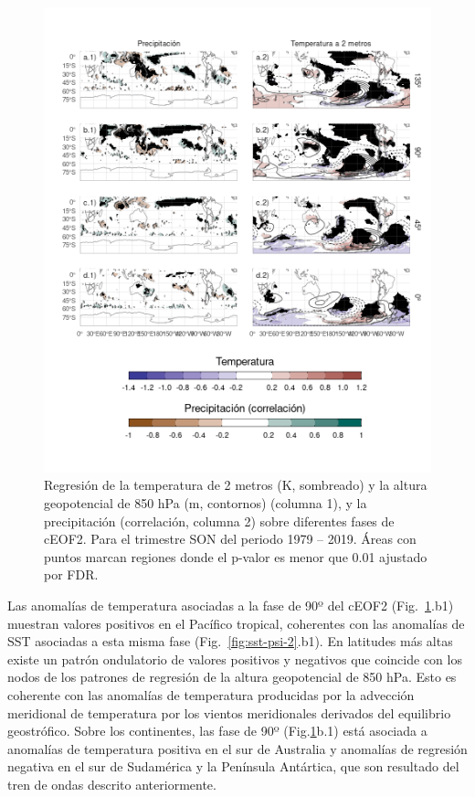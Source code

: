 \documentclass[12pt,oneside]{reedthesis}
\begin{document}
\begin{figure}
\includegraphics{figures/20-ceofs/pp-temp-2-1} \caption{Regresión de la temperatura de 2 metros (K, sombreado) y la altura geopotencial de 850 hPa (m, contornos) (columna 1), y la precipitación (correlación, columna 2) sobre diferentes fases de cEOF2.
Para el trimestre SON del periodo 1979 -- 2019.
Áreas con puntos marcan regiones donde el p-valor es menor que 0.01 ajustado por FDR.}\label{fig:pp-temp-2}
\end{figure}

Las anomalías de temperatura asociadas a la fase de 90º del cEOF2 (Fig.~\ref{fig:pp-temp-2}.b1) muestran valores positivos en el Pacífico tropical, coherentes con las anomalías de SST asociadas a esta misma fase (Fig.~\ref{fig:sst-psi-2}.b1).
En latitudes más altas existe un patrón ondulatorio de valores positivos y negativos que coincide con los nodos de los patrones de regresión de la altura geopotencial de 850 hPa.
Esto es coherente con las anomalías de temperatura producidas por la advección meridional de temperatura por los vientos meridionales derivados del equilibrio geostrófico.
Sobre los continentes, las fase de 90º (Fig.\ref{fig:pp-temp-2}b.1) está asociada a anomalías de temperatura positiva en el sur de Australia y anomalías de regresión negativa en el sur de Sudamérica y la Península Antártica, que son resultado del tren de ondas descrito anteriormente.
\end{document}
